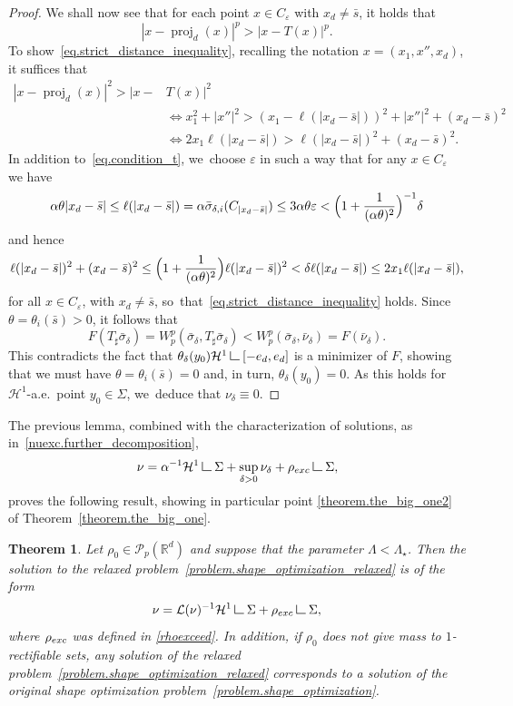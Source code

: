 \documentclass[11pt]{article}
\numberwithin{equation}{section}
\newtheorem{theorem}{Theorem}[section]
\theoremstyle{definition}
\newcommand\LM[1]{\hbox{\vrule width.5pt \vbox to#1pt{\vfill \hrule width#1pt height.5pt}}}
\newcommand\LL{{\mathchoice {\>\LM7\>}{\>\LM7\>}{\,\LM5\,}{\,\LM{3.35}\,}}}
\newcommand{\mres}{\LL}
\newcommand\cH{\mathcal{H}}
\newcommand{\RR}{\mathbb{R}}
\DeclareMathOperator{\proj}{proj}
\newcommand{\rhoexc}{\rho_{\textup{exc}}}
\begin{document}
\begin{proof}
We shall now see that for each point $x \in C_\varepsilon$ with $x_d\neq \bar s$, it holds that
\begin{equation}\label{eq.strict_distance_inequality}
|x - \proj_d(x)|^p > |x - T(x)|^p.
\end{equation}
To show~\eqref{eq.strict_distance_inequality}, recalling the notation $x = (x_1, x'', x_d)$, it suffices that
\begin{align*}
|x - \proj_d(x)|^2 > |x- & T(x)|^2
\\
&\iff
x_1^2 + |x''|^2 >
(x_1-\ell(|x_d-\bar s|))^2+|x''|^2 + (x_d-\bar s)^2\\
&\iff
2x_1\ell(|x_d-\bar s|) > \ell(|x_d-\bar s|)^2 + (x_d-\bar s)^2.
\end{align*}
In addition to~\eqref{eq.condition_t}, we~choose $\varepsilon$ in such a way that for any $x \in C_\varepsilon$ we have
\[ \alpha\theta |x_d-\bar s|
\le
\ell(|x_d-\bar s|) = \alpha \bar \sigma_{\delta, i}(C_{|x_d-\bar s|})
\le 3\alpha\theta\varepsilon < \Bigl(1 +\frac{1}{(\alpha\theta)^2}\Bigr)^{-1}\delta
\]
and hence
\[
\ell(|x_d-\bar s|)^2+(x_d-\bar s)^2 \le
\Bigl(1 + \frac{1}{(\alpha\theta)^2} \Bigr)
\ell(|x_d-\bar s|)^2
< \delta \ell(|x_d-\bar s|)
\le 2x_1 \ell(|x_d-\bar s|),
\]
for all $x \in C_{\varepsilon}$, with $x_d \neq \bar s$, so~that~\eqref{eq.strict_distance_inequality} holds.
Since $\theta=\theta_i(\bar s)>0$, it follows that
\[
F(T_\sharp \bar \sigma_{\delta})=
W_p^p(\bar \sigma_{\delta} , T_\sharp\bar \sigma_{\delta})
<
W_p^p(\bar \sigma_{\delta}, \bar \nu_{\delta})
=
F(\bar \nu_{\delta}).
\]
This contradicts the fact that $\theta_\delta(y_0) \cH^1\mres [-e_d, e_d]$ is a minimizer of $F$, showing that we must have $\theta=\theta_i(\bar s)=0$ and, in turn, $\theta_\delta(y_0)=0$.
As this holds for $\cH^1$-a.e.~point $y_0 \in \Sigma$, we~deduce that $\nu_\delta \equiv 0$.
\end{proof}

The previous lemma, combined with the characterization of solutions, as in~\eqref{nuexc.further_decomposition},
\[
\nu = \alpha^{-1}\cH^1\mres \Sigma + \sup_{\delta > 0}\nu_\delta + \rhoexc\mres \Sigma,
\]
proves the following result, showing in particular point \eqref{theorem.the_big_one2} of Theorem~\ref{theorem.the_big_one}.

\begin{theorem}\label{theorem.inR2_density_is_1}
Let $\rho_0 \in \mathcal{P}_p(\RR^d)$ and suppose that the parameter $\Lambda < \Lambda_\star$. Then the solution to the relaxed problem~\eqref{problem.shape_optimization_relaxed} is of the form
\[
\nu =
\mathcal{L}(\nu)^{-1}\cH^1\mres \Sigma
+
\rhoexc\mres \Sigma,
\]
where $\rhoexc$ was defined in \eqref{rhoexceed}.
In addition, if $\rho_0$ does not give mass to $1$-rectifiable sets, any solution of the relaxed problem~\eqref{problem.shape_optimization_relaxed} corresponds to a solution of the original shape optimization problem~\eqref{problem.shape_optimization}.
\end{theorem}
\end{document}
